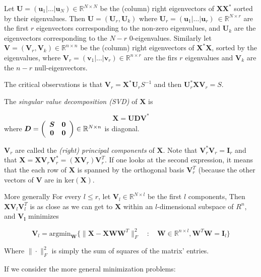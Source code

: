 \documentclass[11pt, a4paper]{report}
\theoremstyle{plain}
\theoremstyle{definition}
\theoremstyle{remark}
\newcommand{\R}{\mathbb{R}}
\newcommand{\X}{\mathbf{X}}
\newcommand{\W}{\mathbf{W}}
\newcommand{\bv}[1]{\boldsymbol{#1}}
\begin{document}
Let $\bv{U} = (\bv{u}_1 | \dots | \bv{u}_N) \in \R^{N \times N}$
be the (column) right eigenvectors of $\X \X^*$ sorted
by their eigenvalues. 
Then $\bv{U} = (\bv{U}_r, \bv{U}_k)$ 
where $\bv{U}_r = (\bv{u}_1 | \dots | \bv{u}_r) \ \in \R^{N \times r}$ are the first $r$
eigenvectors corresponding to the non-zero eigenvalues, and $\bv{U}_k$ are the
eigenvectors corresponding to the $N-r$ $0$-eigenvalues.
Similarly let 
$\bv{V}  = (\bv{V}_r, \bv{V}_k)\in \R^{n \times n}$
be the (column) right eigenvectors of $\X^* \X$, sorted
by the eigenvalues, 
where $\bv{V}_r  = (\bv{v}_1 | \dots | \bv{v}_r) \in \R^{n \times r}$ are the firs $r$
eigenvalues and $\bv{V}_k$ are the $n-r$ null-eigenvectors.

The critical observations is that $\bv{V}_r = \bv{X}^* \bv{U}_r S^{-1}$
and then $\bv{U}_r^* \X \bv{V}_r = S$.

The \textit{singular value decomposition (SVD)} of $\X$ is 

\begin{equation}
\label{eq:svd}
\X = \bv{U} \bv{D} \bv{V}^*
\end{equation}
where 
$\bv{D} =
\left(
\begin{array}{c c}
\bv{S} & \bv{0} \\
\bv{0} & \bv{0}
\end{array}
\right) \in \R^{N \times n}
$ is diagonal.

$\bv{V}_r$ are called the \textit{(right) principal components} of $\X$.
Note that $\bv{V}_r^* \bv{V}_r = \bv{I}_r$ and that 
$\X = \X \bv{V}_r \bv{V}_r^* = (\X \bv{V}_r) \bv{V}_r^T$. If one looks at the second expression, 
it means that the each row of $\X$ is spanned by the orthogonal
basis $\bv{V}_r^T$ (because the other vectors of $\bv{V}$ are in $\text{ker}(\X)$.

More generally
For every $l \leq r$, let $\bv{V}_l \in \R^{N \times l}$ be the first $l$ components,
Then $\X\bv{V}_l \bv{V}_l^T$ is as close as we can get to $\X$ within an
$l$-dimensional subspace of $R^n$, and $\bv{V_l}$ minimizes

\begin{equation}
\label{eqn:pca}
\bv{V}_l = \text{argmin}_{\W} \{
\|\X - \X \bv{W}\bv{W}^T\|_F^2 \quad : \quad \bv{W} \in \R^{n \times l}, \bv{W}^T \bv{W} =
\bv{I}_l\}
\end{equation} 

Where $\| \cdot \|_F^2$ is simply the sum of squares of the matrix' entries.

If we consider the more general
minimization problems: 
\end{document}
